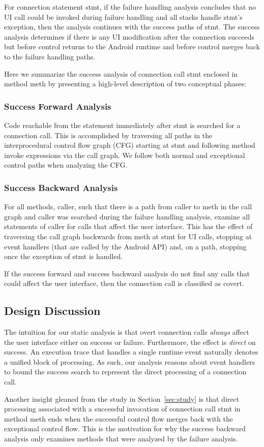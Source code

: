 For connection statement stmt, if the failure handling analysis
concludes that no UI call could be invoked during failure
handling and all stacks handle stmt's exception, then the analysis
continues with the success paths of stmt. The success analysis
determines if there is any UI modification after the
connection succeeds but before control returns to the Android runtime
and before control merges back to the failure handling paths.

Here we summarize the success analysis of connection call stmt enclosed
in method meth by presenting a high-level description of two conceptual
phases:

\subsubsection{Success Forward Analysis} Code reachable from the
  statement immediately after stmt is searched for a connection call.
  This is accomplished by traversing all paths in the interprocedural
  control flow graph (CFG) starting at stmt and following method invoke
  expressions via the call graph.  We follow both normal and
  exceptional control paths when analyzing the CFG.

\subsubsection{Success Backward Analysis} For all methods, caller, such
  that there is a path from caller to meth in the call graph and caller was
  searched during the failure handling analysis, examine all
  statements of caller for calls that affect the user interface.  This
  has the effect of traversing the call graph backwards from meth at
  stmt for UI calls, stopping at event handlers (that are called by the
  Android API) and, on a path, stopping once the exception of stmt is
  handled.

If the success forward and success backward analysis do not find any
calls that could affect the user interface, then the connection call
is classified as covert.

\subsection{Design Discussion}

The intuition for our static analysis is that overt connection calls
{\it always} affect the user interface either on success or
failure. Furthermore, the effect is {\it direct} on success.  An
execution trace that handles a single runtime event naturally denotes
a unified block of processing. As such, our analysis reasons about
event handlers to bound the success search to represent the direct
processing of a connection call.

Another insight gleaned from the study in Section~\ref{sec:study} is
that direct processing associated with a successful invocation of
connection call stmt in method meth ends when the successful control
flow merges back with the exceptional control flow. This is the
motivation for why the success backward analysis only examines methods
that were analyzed by the failure analysis.  

